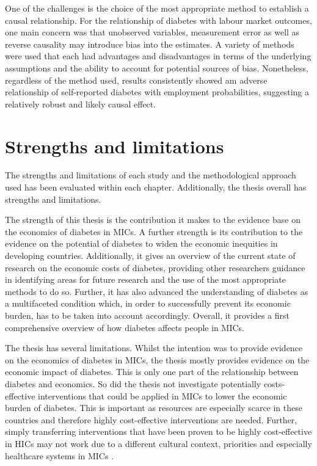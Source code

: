 One of the challenges is the choice of the most appropriate method to establish a causal relationship. For the relationship of diabetes with labour market outcomes, one main concern was that unobserved variables, measurement error as well as reverse causality may introduce bias into the estimates. A variety of methods were used that each had advantages and disadvantages in terms of the underlying assumptions and the ability to account for potential sources of bias. Nonetheless, regardless of the method used, results consistently showed am adverse relationship of self-reported diabetes with employment probabilities, suggesting a relatively robust and likely causal effect.

\section{Strengths and limitations}

The strengths and limitations of each study and the methodological approach used has been evaluated within each chapter. Additionally, the thesis overall has strengths and limitations.

The strength of this thesis is the contribution it makes to the evidence base on the economics of diabetes in \acp{MIC}. A further strength is its contribution to the evidence on the potential of diabetes to widen the economic inequities in developing countries. Additionally, it gives an overview of the current state of research on the economic costs of diabetes, providing other researchers guidance in identifying areas for future research and the use of the most appropriate methods to do so. Further, it has also advanced the understanding of diabetes as a multifaceted condition which, in order to successfully prevent its economic burden, has to be taken into account accordingly. Overall, it provides a first comprehensive overview of how diabetes affects people in \acp{MIC}.

The thesis has several limitations. Whilst the intention was to provide evidence on the economics of diabetes in \acp{MIC}, the thesis mostly provides evidence on the economic impact of diabetes. This is only one part of the relationship between diabetes and economics. So did the thesis not investigate potentially costs-effective interventions that could be applied in \acp{MIC} to lower the economic burden of diabetes. This is important as resources are especially scarce in these countries and therefore highly cost-effective interventions are needed. Further, simply transferring interventions that have been proven to be highly cost-effective in \acp{HIC} may not work due to a different cultural context, priorities and especially healthcare systems in \acp{MIC} \parencite{Mills2014}.

